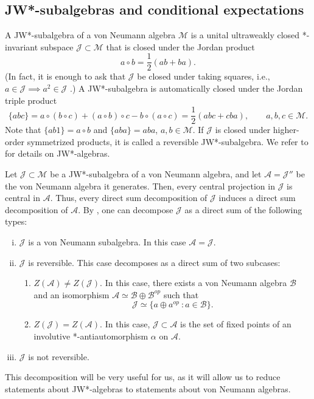 \documentclass[12pt]{article}
\def\Me{\mathcal M}
\def\Je{\mathcal J}
\def\Be{\mathcal B}
\def\Ae{\mathcal A}
\theoremstyle{definition}
\theoremstyle{remark}
\begin{document}
\subsection{JW*-subalgebras and conditional expectations}\label{sec:prelim-CEs}

A JW*-subalgebra of a von Neumann algebra $\Me$ is a unital ultraweakly closed *-invariant subspace $\Je\subset \Me$ that is closed under the Jordan product
\begin{equation}
    a\circ b= \frac12(ab+ba).
\end{equation}
(In fact, it is enough to ask that $\Je$ be closed under taking squares, i.e., $a\in \Je\implies a^2\in \Je$ \cite{hanche-olsen_jordan_1984}.)
A JW*-subalgebra is automatically closed under the Jordan triple product
\begin{equation}\label{eq:triple-prod}
    \{abc\} = a \circ (b\circ c) + (a\circ b)\circ c - b \circ(a\circ c) = \frac12(abc+cba), \qquad a,b,c \in \Me.
\end{equation}
Note that $\{ab1\} = a\circ b$ and $\{aba\} = aba$, $a,b\in \Me$.
If $\Je$ is closed under higher-order symmetrized products, it is called a reversible JW*-subalgebra.
We refer to \cite{hanche-olsen_jordan_1984} for details on JW*-algebras. 


Let $\Je\subset \Me$ be a JW*-subalgebra of a von Neumann algebra, and let $\Ae=\Je''$ be the von Neumann algebra it generates.
Then, every central projection in $\Je$ is central in $\Ae$. Thus, every direct sum decomposition of $\Je$ induces a direct sum decomposition of $\Ae$. 
By \cite{haagerup1995positive}, one can decompose $\Je$ as a direct sum of the following types:
\begin{enumerate}[(i)]
    \item\label{it:case-i} $\Je$ is a von Neumann subalgebra. In this case $\Ae =\Je$.
    \item\label{it:case-ii} $\Je$ is reversible. This case decomposes as a direct sum of two subcases:
    \begin{enumerate}[({ii.}a)]
        \item\label{it:case-iia} $Z(\Ae) \ne Z(\Je)$. In this case, there exists a von Neumann algebra $\Be$ and an isomorphism $\Ae \simeq \Be \oplus \Be^{op}$ such that 
        \begin{equation}
            \Je \simeq \{ a\oplus a^{op} \ : a\in \Be\}.
        \end{equation}
        \item\label{it:case-iib} 
        $Z(\Je)=Z(\Ae)$. In this case, $\Je \subset \Ae$ is the set of fixed points of an involutive *-antiautomorphism $\alpha$ on $\Ae$.
    \end{enumerate}
    \item\label{it:case-iii} $\Je$ is not reversible. 
\end{enumerate}
This decomposition will be very useful for us, as it will allow us to reduce statements about JW*-algebras to statements about von Neumann algebras.
\end{document}
